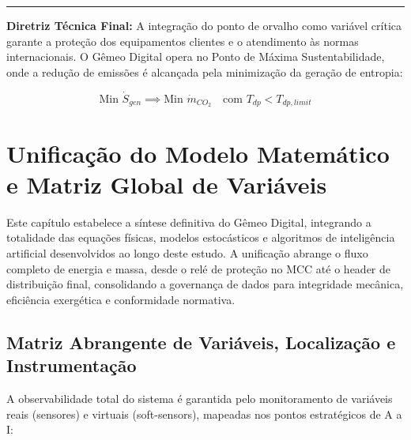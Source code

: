 \documentclass[12pt,a4paper]{article}
\numberwithin{equation}{section}
\numberwithin{table}{section}
\numberwithin{figure}{section}
\begin{document}
\vspace{1em}
\hrule
\vspace{1em}

\textbf{Diretriz Técnica Final:} A integração do ponto de orvalho como variável crítica garante a proteção dos equipamentos clientes e o atendimento às normas internacionais. O Gêmeo Digital opera no Ponto de Máxima Sustentabilidade, onde a redução de emissões é alcançada pela minimização da geração de entropia:

\begin{equation}\label{eq:s17-7}
\boxed{\text{Min } \dot{S}_{gen} \implies \text{Min } \dot{m}_{CO_2} \quad \text{com } T_{dp} < T_{dp,limit}}
\end{equation}




\section{Unificação do Modelo Matemático e Matriz Global de Variáveis}

Este capítulo estabelece a síntese definitiva do Gêmeo Digital, integrando a totalidade das equações físicas, modelos estocásticos e algoritmos de inteligência artificial desenvolvidos ao longo deste estudo. A unificação abrange o fluxo completo de energia e massa, desde o relé de proteção no MCC até o header de distribuição final, consolidando a governança de dados para integridade mecânica, eficiência exergética e conformidade normativa.

\subsection{Matriz Abrangente de Variáveis, Localização e Instrumentação}

A observabilidade total do sistema é garantida pelo monitoramento de variáveis reais (sensores) e virtuais (soft-sensors), mapeadas nos pontos estratégicos de A a I:
\end{document}
